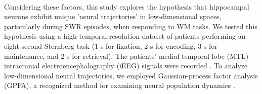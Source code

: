 \\
\indent
Considering these factors, this study explores the hypothesis that hippocampal neurons exhibit unique 'neural trajectories' in low-dimensional spaces, particularly during SWR episodes, when responding to WM tasks. We tested this hypothesis using a high-temporal-resolution dataset of patients performing an eight-second Sternberg task (1 s for fixation, 2 s for encoding, 3 s for maintenance, and 2 s for retrieval). The patients' medial temporal lobe (MTL) intracranial electroencephalography (iEEG) signals were recorded \cite{boran_dataset_2020}. To analyze low-dimensional neural trajectories, we employed Gaussian-process factor analysis (GPFA), a recognized method for examining neural population dynamics \cite{yu_gaussian-process_2009}.
\label{sec:introduction}